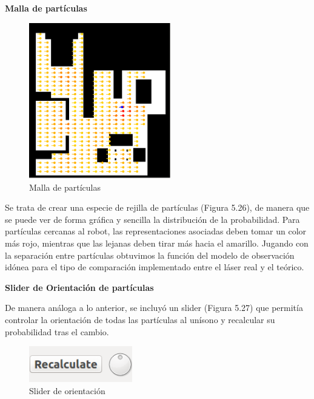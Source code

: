 \textbf{Malla de partículas}

\begin{figure}[H]
	\begin{center}
	\includegraphics[width=0.55\textwidth]{figures/mallaparticulas.png}
	\caption{Malla de partículas}
	\label{fig.mallaparticulas}
	\end{center}
\end{figure}
Se trata de crear una especie de rejilla de partículas (Figura 5.26), de manera que se puede ver de forma gráfica y sencilla la distribución de la probabilidad. Para partículas cercanas al robot, las representaciones asociadas deben tomar un color más rojo, mientras que las lejanas deben tirar más hacia el amarillo. Jugando con la separación entre partículas obtuvimos la función del modelo de observación idónea para el tipo de comparación implementado entre el láser real y el teórico.

\vspace{0.5cm}
\textbf{Slider de Orientación de partículas}

De manera análoga a lo anterior, se incluyó un slider (Figura 5.27) que permitía controlar la orientación de todas las partículas al unísono y recalcular su probabilidad tras el cambio.

\begin{figure}[H]
	\begin{center}
	\includegraphics[width=0.40\textwidth]{figures/slider.png}
	\caption{Slider de orientación}
	\label{fig.slider}
	\end{center}
\end{figure}

